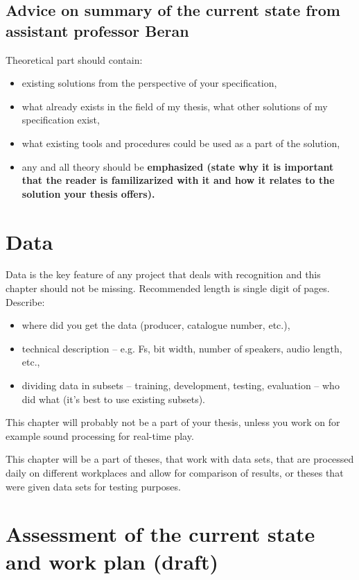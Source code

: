 \subsection*{Advice on summary of the current state from assistant professor Beran}

Theoretical part should contain:
\begin{itemize}
  \item{existing solutions from the perspective of your specification,}
  \item{what already exists in the field of my thesis, what other solutions of my specification exist,}
  \item{what existing tools and procedures could be used as a part of the solution,}
  \item{any and all theory should be \bf emphasized \rm (state why it is important that the reader is familizarized with it and how it relates to the solution your thesis offers).}
\end{itemize}
    
\section{Data}

Data is the key feature of any project that deals with recognition and this chapter should not be missing. Recommended length is single digit of pages. Describe:
\begin{itemize}
  \item{where did you get the data (producer, catalogue number, etc.),}
  \item{technical description -- e.g. Fs, bit width, number of speakers, audio length, etc.,}
  \item{dividing data in subsets -- training, development, testing, evaluation -- who did what (it's best to use existing subsets).}
\end{itemize}

This chapter will probably not be a part of your thesis, unless you work on for example sound processing for real-time play.

This chapter will be a part of theses, that work with data sets, that are processed daily on different workplaces and allow for comparison of results, or theses that were given data sets for testing purposes.


\section{Assessment of the current state and work plan (draft)}
\label{navrh}

